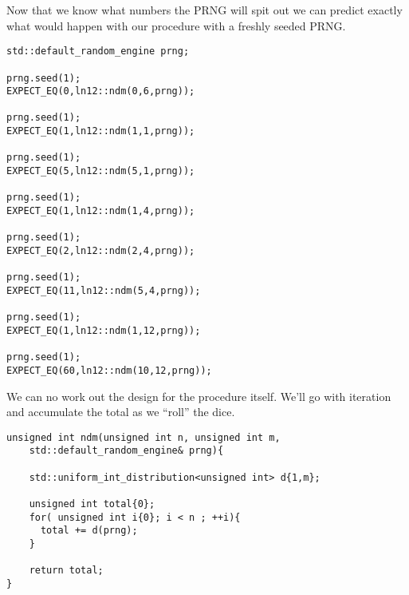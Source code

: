 \documentclass[]{tufte-handout}
\begin{document}
Now that we know what numbers the PRNG will spit out we can predict exactly what would happen with our procedure with a freshly seeded PRNG.  
\begin{verbatim}
std::default_random_engine prng;

prng.seed(1);
EXPECT_EQ(0,ln12::ndm(0,6,prng));

prng.seed(1);
EXPECT_EQ(1,ln12::ndm(1,1,prng));

prng.seed(1);
EXPECT_EQ(5,ln12::ndm(5,1,prng));

prng.seed(1);    
EXPECT_EQ(1,ln12::ndm(1,4,prng));

prng.seed(1);
EXPECT_EQ(2,ln12::ndm(2,4,prng));

prng.seed(1);
EXPECT_EQ(11,ln12::ndm(5,4,prng));

prng.seed(1);
EXPECT_EQ(1,ln12::ndm(1,12,prng));

prng.seed(1);
EXPECT_EQ(60,ln12::ndm(10,12,prng));
\end{verbatim}


We can no work out the design for the procedure itself.  We'll go with iteration and accumulate the total as we ``roll'' the dice.
\begin{verbatim}
unsigned int ndm(unsigned int n, unsigned int m,
	std::default_random_engine& prng){
  
    std::uniform_int_distribution<unsigned int> d{1,m};

    unsigned int total{0};
    for( unsigned int i{0}; i < n ; ++i){
      total += d(prng);
    }

    return total;
}
\end{verbatim}
\end{document}
